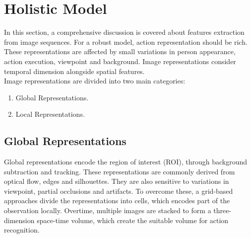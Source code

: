 \section{Holistic Model}
\hspace{5mm} In this section, a comprehensive discussion is covered about features extraction from image sequences. For a robust model, action representation should be rich. These representations are affected by small variations in person appearance, action execution, viewpoint and background. Image representations consider temporal dimension alongside spatial features.\\
\hspace{5mm} Image representations are divided into two main categories:\\
\begin{enumerate}
\item Global Representations.
\item Local Representations.
\end{enumerate}

\subsection{Global Representations}
\hspace{5mm} Global representations encode the region of interest (ROI), through background subtraction and tracking. These representations are commonly derived from optical flow, edges and silhouettes. They are also sensitive to variations in viewpoint, partial occlusions and artifacts. To overcome these, a grid-based approaches divide the representations into cells, which encodes part of the observation locally. Overtime, multiple images are stacked to form a three-dimension space-time volume, which create the suitable volume for action recognition.\\ 

